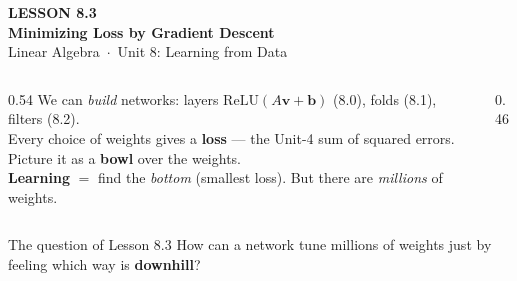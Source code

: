 \documentclass[aspectratio=169, 11pt]{beamer}
\newcommand{\vv}{\mathbf{v}}
\newcommand{\bb}{\mathbf{b}}
\newcommand{\relu}{\mathrm{ReLU}}
\begin{document}
{
\begin{frame}[plain]
  \vspace{2.8cm}\hspace{0.55cm}%
  \begin{minipage}{0.9\textwidth}
    {\color{goldacc}\bfseries\small LESSON 8.3}\\[0.5cm]
    {\color{white}\bfseries\LARGE Minimizing Loss by Gradient Descent}\\[1.0cm]
    {\color{blushmid}\small Linear Algebra~$\cdot$~Unit 8: Learning from Data}
  \end{minipage}
\end{frame}
}

\begin{frame}[t, plain]
  \begin{columns}[T]
    \begin{column}{0.54\textwidth}
      We can \emph{build} networks: layers $\relu(A\vv+\bb)$ (8.0), folds (8.1), filters (8.2).\\[6pt]
      Every choice of weights gives a \textbf{loss} --- the Unit-4 sum of squared errors. Picture it as a
      \textbf{bowl} over the weights.\\[6pt]
      \textbf{Learning} $=$ find the \emph{bottom} (smallest loss). But there are \emph{millions} of weights.
    \end{column}
    \begin{column}{0.46\textwidth}
      \centering
    \end{column}
  \end{columns}
  \vspace{2pt}
  \begin{block}{The question of Lesson 8.3}
    How can a network tune millions of weights just by feeling which way is \textbf{downhill}?
  \end{block}
\end{frame}
\end{document}
